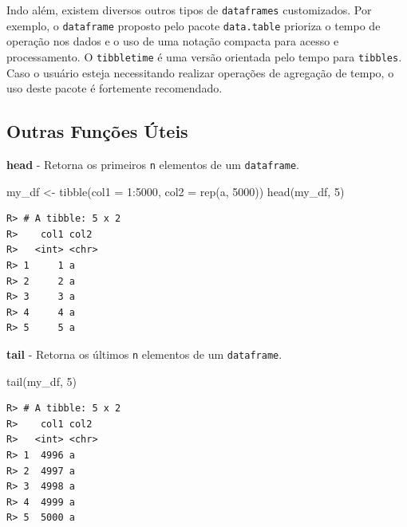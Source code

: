 \documentclass[
  11pt,
]{book}
\newenvironment{Shaded}{\begin{snugshade}}{\end{snugshade}}
\newcommand{\AttributeTok}[1]{\textcolor[rgb]{0.61,0.61,0.61}{#1}}
\newcommand{\DecValTok}[1]{\textcolor[rgb]{0.06,0.06,0.06}{#1}}
\newcommand{\FunctionTok}[1]{\textcolor[rgb]{0,0,0}{#1}}
\newcommand{\NormalTok}[1]{#1}
\newcommand{\OtherTok}[1]{\textcolor[rgb]{0.37,0.37,0.37}{#1}}
\newcommand{\SpecialCharTok}[1]{\textcolor[rgb]{0,0,0}{#1}}
\newcommand{\StringTok}[1]{\textcolor[rgb]{0.5,0.5,0.5}{#1}}
\begin{document}
Indo além, existem diversos outros tipos de \texttt{dataframes} customizados. Por exemplo, o \texttt{dataframe} proposto pelo pacote \texttt{data.table} \citep{R-data.table} prioriza o tempo de operação nos dados e o uso de uma notação compacta para acesso e processamento. O \texttt{tibbletime} \citep{R-tibbletime} é uma versão orientada pelo tempo para \texttt{tibbles}. Caso o usuário esteja necessitando realizar operações de agregação de tempo, o uso deste pacote é fortemente recomendado.

\hypertarget{outras-funuxe7uxf5es-uxfateis}{%
\subsection{Outras Funções Úteis}\label{outras-funuxe7uxf5es-uxfateis}}

\textbf{head} - Retorna os primeiros \texttt{n} elementos de um \texttt{dataframe}.

\begin{Shaded}
\begin{Highlighting}[]
\NormalTok{my\_df }\OtherTok{\textless{}{-}} \FunctionTok{tibble}\NormalTok{(}\AttributeTok{col1 =} \DecValTok{1}\SpecialCharTok{:}\DecValTok{5000}\NormalTok{, }\AttributeTok{col2 =} \FunctionTok{rep}\NormalTok{(}\StringTok{\textquotesingle{}a\textquotesingle{}}\NormalTok{, }\DecValTok{5000}\NormalTok{))}
\FunctionTok{head}\NormalTok{(my\_df, }\DecValTok{5}\NormalTok{)}
\end{Highlighting}
\end{Shaded}

\begin{verbatim}
R> # A tibble: 5 x 2
R>    col1 col2 
R>   <int> <chr>
R> 1     1 a    
R> 2     2 a    
R> 3     3 a    
R> 4     4 a    
R> 5     5 a
\end{verbatim}

\textbf{tail} - Retorna os últimos \texttt{n} elementos de um \texttt{dataframe}.

\begin{Shaded}
\begin{Highlighting}[]
\FunctionTok{tail}\NormalTok{(my\_df, }\DecValTok{5}\NormalTok{)}
\end{Highlighting}
\end{Shaded}

\begin{verbatim}
R> # A tibble: 5 x 2
R>    col1 col2 
R>   <int> <chr>
R> 1  4996 a    
R> 2  4997 a    
R> 3  4998 a    
R> 4  4999 a    
R> 5  5000 a
\end{verbatim}
\end{document}
